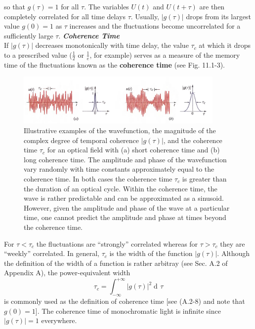\documentclass{article}
\numberwithin{figure}{subsection}
\numberwithin{table}{subsection}
\DeclareMathOperator\dif{d\!}
\begin{document}
so that $ g(\tau) = 1$ for all $ \tau $. The variables $ U(t) $ and $ U(t+\tau) $ are then completely correlated for all time delays $ \tau $. Usually, $ \lvert g(\tau) \rvert $ drops from its largest value $ g(0) = 1 $ as $ \tau $ increases and the fluctuations become uncorrelated for a sufficiently large $ \tau $.
\bigbreak\noindent\textcolor{ksc}{\textbf{\textsl{Coherence Time}}}\\
If $\lvert g(\tau) \rvert $ decreases monotonically with time delay, the value $ \tau_c $ at which it drops to a prescribed value ($ \frac{1}{2} $ or $ \frac{1}{e} $, for example) serves as a measure of the memory time of the fluctuations known as the \textbf{coherence time} (see Fig. 11.1-3).
\begin{figure}[H]
\centering
\includegraphics[width=0.9\textwidth]{11_1_3.PNG}
\caption{Illustrative examples of the wavefunction, the magnitude of the complex degree of
temporal coherence $\lvert g(\tau) \rvert $, and the coherence time $ \tau_c $ for an optical field with (a) short coherence time and (b) long coherence time. The amplitude and phase of the wavefunction vary randomly with time
constants approximately equal to the coherence time. In both cases the coherence time $ \tau_c $ is greater
than the duration of an optical cycle. Within the coherence time, the wave is rather predictable and can
be approximated as a sinusoid. However, given the amplitude and phase of the wave at a particular
time, one cannot predict the amplitude and phase at times beyond the coherence time.}
\label{fig: 11_1_3}
\end{figure}
\par For $\tau < \tau_c $ the fluctuations are ``strongly'' correlated whereas for $ \tau > \tau_c $ they are ``weekly'' correlated. In general, $ \tau_c $ is the width of the function  $\lvert g(\tau) \rvert $. Although the definition of the width of a function is rather arbitray (see Sec. A.2 of Appendix A), the power-equivalent width
\begin{equation}
\tau_c = \int_{-\infty}^{+\infty} \lvert g(\tau) \rvert ^2 \dif \tau
\end{equation}
is commonly used as the definition of coherence time [see (A.2-8) and note that $ g(0) = 1$]. The coherence time of monochromatic light is infinite since $\lvert g(\tau) \rvert = 1$ everywhere.
\end{document}
